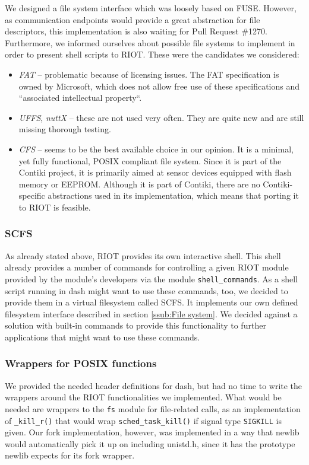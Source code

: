 \documentclass[conference]{IEEEtran}
\begin{document}
We designed a file system interface which was loosely based on
FUSE\cite{fuse}. However, as communication endpoints would provide
a great abstraction for file descriptors, this implementation is also
waiting for Pull Request \#1270. Furthermore, we informed ourselves
about possible file systems to implement in order to present shell
scripts to RIOT. These were the candidates we considered:

\begin{itemize}
  \item \emph{FAT}\cite{fat} -- problematic because of licensing issues. The FAT
    specification is owned by Microsoft, which does not allow free use
    of these specifications and ``associated intellectual
    property``\cite{fatlicense}.
  \item \emph{UFFS}\cite{uffs}, \emph{nuttX}\cite{nuttx} -- these are
    not used very often. They are quite new and are still missing
    thorough testing.
  \item \emph{CFS}\cite{cfs} -- seems to be the best available choice in
    our opinion. It is a minimal, yet fully functional, POSIX compliant
    file system. Since it is part of the Contiki project\cite{contiki},
    it is primarily aimed at sensor devices equipped with flash memory
    or EEPROM. Although it is part of Contiki, there are no
    Contiki-specific abstractions used in its implementation, which
    means that porting it to RIOT is feasible.
\end{itemize}

\subsubsection{SCFS}
\label{ssub:SCFS}
As already stated above, RIOT provides its own interactive shell. This
shell already provides a number of commands for controlling a given RIOT
module provided by the module's developers via the module
\texttt{shell\_commands}. As a shell script running in dash might want
to use these commands, too, we decided to provide them in a virtual
filesystem called SCFS. It implements our own defined filesystem
interface described in section \ref{ssub:File system}. We decided
against a solution with built-in commands to provide this functionality
to further applications that might want to use these commands.

\subsubsection{Wrappers for POSIX functions}
\label{ssub:Wrappers for POSIX functions}
We provided the needed header definitions for dash, but had no time to
write the wrappers around the RIOT functionalities we implemented. What
would be needed are wrappers to the \texttt{fs} module for file-related
calls, as an implementation of \texttt{\_kill\_r()} that would wrap
\texttt{sched\_task\_kill()} if signal type \texttt{SIGKILL} is given.
Our fork implementation, however, was implemented in a way that newlib
would automatically pick it up on including unistd.h, since it has the
prototype newlib expects for its fork wrapper.
\end{document}
